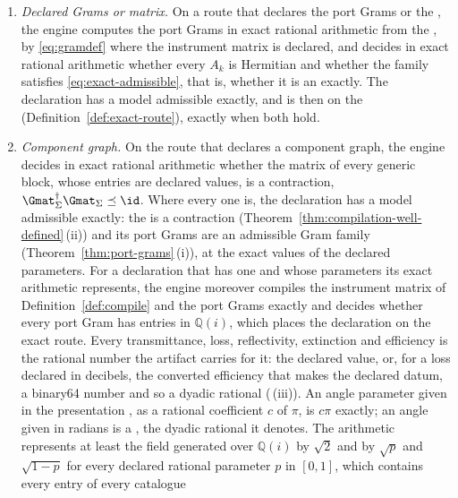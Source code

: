 \begin{requirement}\label{req:exact-route-decision}
\begin{enumerate}[label=(\roman*),leftmargin=2.4em]
\item \emph{Declared Grams or matrix.} On a route that
  declares the port Grams or the , the engine computes
  the port Grams in exact rational arithmetic from the
  , by \eqref{eq:gramdef} where the
  instrument matrix is declared, and decides in exact rational arithmetic
  whether every $A_k$ is Hermitian and whether the family satisfies
  \eqref{eq:exact-admissible}, that is, whether it is an
   exactly. The declaration has a model
  admissible exactly, and is then on the 
  (Definition~\ref{def:exact-route}), exactly when both hold.
\item \emph{Component graph.} On the route that declares a component graph,
  the engine decides in exact rational arithmetic whether the matrix of every
  generic block, whose entries are declared values, is a contraction,
  $\Gmat_\Sigma^{\dagger}\Gmat_\Sigma\preceq\id$. Where every one is, the
  declaration has a model admissible exactly: the 
  is a contraction (Theorem~\ref{thm:compilation-well-defined}\,(ii)) and its
  port Grams are an admissible Gram family (Theorem~\ref{thm:port-grams}\,(i)),
  at the exact values of the declared parameters. For a declaration that
  has one and whose parameters its exact arithmetic represents, the engine
  moreover compiles the instrument matrix of Definition~\ref{def:compile} and
  the port Grams exactly and decides whether every port Gram has entries in
  $\mathbb{Q}(i)$, which places the declaration on the exact route. Every
  transmittance, loss, reflectivity, extinction and efficiency is the
  rational number the artifact carries for it: the declared value, or, for a
  loss declared in decibels, the converted efficiency that
   makes the declared datum, a binary64 number and
  so a dyadic rational (\,(iii)). An angle
  parameter given in the presentation , as a
  rational coefficient $c$ of $\pi$, is $c\pi$ exactly; an angle given in
  radians is a , the dyadic rational it denotes. The
  arithmetic represents at least the field generated over $\mathbb{Q}(i)$ by
  $\sqrt2$ and by $\sqrt p$ and $\sqrt{1-p}$ for every declared rational
  parameter $p$ in $[0,1]$, which contains every entry of every catalogue

\end{enumerate}
\end{requirement}
